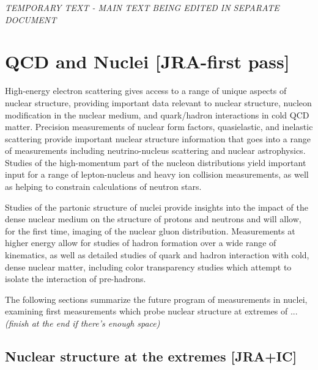 
\newpage

\textit{TEMPORARY TEXT - MAIN TEXT BEING EDITED IN SEPARATE DOCUMENT}


\section{ QCD and Nuclei [JRA-first pass]}
\label{sec:ALERTmeasurements}

High-energy electron scattering gives access to a range of unique aspects of nuclear structure, providing important data relevant to nuclear structure, nucleon modification in the nuclear medium, and quark/hadron interactions in cold QCD matter. Precision measurements of nuclear form factors, quasielastic, and inelastic scattering provide important nuclear structure information that goes into a range of measurements including neutrino-nucleus scattering and nuclear astrophysics. Studies of the high-momentum part of the nucleon distributions yield important input for a range of lepton-nucleus and heavy ion collision measurements, as well as helping to constrain calculations of neutron stars. 

Studies of the partonic structure of nuclei provide insights into the impact of the dense nuclear medium on the structure of protons and neutrons and will allow, for the first time, imaging of the nuclear gluon distribution. Measurements at higher energy allow for studies of hadron formation over a wide range of kinematics, as well as detailed studies of quark and hadron interaction with cold, dense nuclear matter, including color transparency studies which attempt to isolate the interaction of pre-hadrons.

The following sections summarize the future program of measurements in nuclei, examining first measurements which probe nuclear structure at extremes of ... \textit{(finish at the end if there's enough space)}




\subsection{Nuclear structure at the extremes [JRA+IC]}


